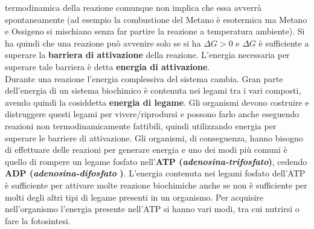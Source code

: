 \documentclass[a4paper,12pt, oneside]{book}
\begin{document}
termodinamica della reazione comunque non implica che essa avverrà
spontaneamente (ad esempio la combustione del Metano è esotermica ma Metano e
Ossigeno si mischiano senza far partire la reazione a temperatura ambiente). Si
ha quindi che una reazione può avvenire solo se si ha $\Delta G>0$ e $\Delta G$
è sufficiente a superare la \textbf{barriera di attivazione} della
reazione. L'energia necessaria per superare tale barriera è detta
\textbf{energia di attivazione}.\\
Durante una reazione l'energia complessiva del sistema cambia. Gran parte
dell'energia di un sistema biochimico è contenuta nei legami tra i vari
composti, avendo quindi la cosiddetta \textbf{energia di legame}. Gli organismi
devono costruire e distruggere questi legami per vivere/riprodursi e possono
farlo anche eseguendo reazioni non termodinamicamente fattibili, quindi
utilizzando energia per superare le barriere di attivazione. Gli organismi, di
conseguenza, hanno bisogno di effettuare delle reazioni per generare energia e
uno dei modi più comuni è quello di rompere un legame fosfato nell'\textbf{ATP
(\textit{adenosina-trifosfato})}, cedendo \textbf{ADP
(\textit{adenosina-difosfato })}. L'energia contenuta nei legami fosfato
dell'ATP è sufficiente per attivare molte reazione biochimiche anche se non è
sufficiente per molti degli altri tipi di legame presenti in
un organismo. Per acquisire nell'organismo l'energia presente nell'ATP si hanno
vari modi, tra cui nutrirsi o fare la fotosintesi.
\end{document}
